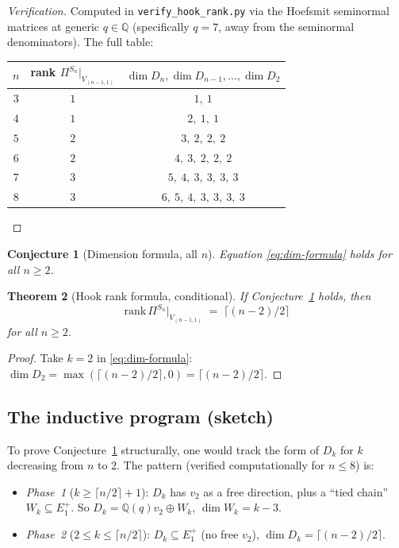 \documentclass[11pt]{article}
\newtheorem{theorem}{Theorem}
\newtheorem{conjecture}[theorem]{Conjecture}
\theoremstyle{definition}
\begin{document}
\begin{proof}[Verification]
Computed in \texttt{verify\_hook\_rank.py} via the Hoefsmit seminormal
matrices at generic $q\in\mathbb{Q}$ (specifically $q=7$, away from
the seminormal denominators).
The full table:
\begin{center}
\begin{tabular}{c c c}
\toprule
$n$ & rank $\Pi^{S_n}|_{V_{(n-1,1)}}$ & $\dim D_n,\dim D_{n-1},\ldots,\dim D_2$ \\
\midrule
$3$ & $1$ & $1,\ 1$ \\
$4$ & $1$ & $2,\ 1,\ 1$ \\
$5$ & $2$ & $3,\ 2,\ 2,\ 2$ \\
$6$ & $2$ & $4,\ 3,\ 2,\ 2,\ 2$ \\
$7$ & $3$ & $5,\ 4,\ 3,\ 3,\ 3,\ 3$ \\
$8$ & $3$ & $6,\ 5,\ 4,\ 3,\ 3,\ 3,\ 3$ \\
\bottomrule
\end{tabular}
\end{center}
\end{proof}

\begin{conjecture}[Dimension formula, all $n$]\label{conj:dim}
Equation \eqref{eq:dim-formula} holds for all $n\ge 2$.
\end{conjecture}

\begin{theorem}[Hook rank formula, conditional]\label{thm:main-conditional}
If Conjecture~\ref{conj:dim} holds, then
\[
   \mathrm{rank}\,\Pi^{S_n}|_{V_{(n-1,1)}} \;=\; \lceil(n-2)/2\rceil
\]
for all $n\ge 2$.
\end{theorem}
\begin{proof}
Take $k=2$ in \eqref{eq:dim-formula}: $\dim D_2=\max(\lceil(n-2)/2\rceil,0)=\lceil(n-2)/2\rceil$.
\end{proof}

\subsection{The inductive program (sketch)}\label{ssec:program}

To prove Conjecture~\ref{conj:dim} structurally, one would track the
form of $D_k$ for $k$ decreasing from $n$ to $2$. The pattern (verified
computationally for $n\le 8$) is:
\begin{itemize}[topsep=0.3em,itemsep=0.2em,leftmargin=2em]
\item \emph{Phase~1} ($k\ge\lceil n/2\rceil+1$): $D_k$ has $v_2$ as a
  free direction, plus a ``tied chain'' $W_k\subseteq E_1^+$. So
  $D_k=\mathbb{Q}(q)v_2\oplus W_k$, $\dim W_k=k-3$.
\item \emph{Phase~2} ($2\le k\le \lceil n/2\rceil$): $D_k\subseteq E_1^+$
  (no free $v_2$), $\dim D_k=\lceil(n-2)/2\rceil$.
\end{itemize}
\end{document}
